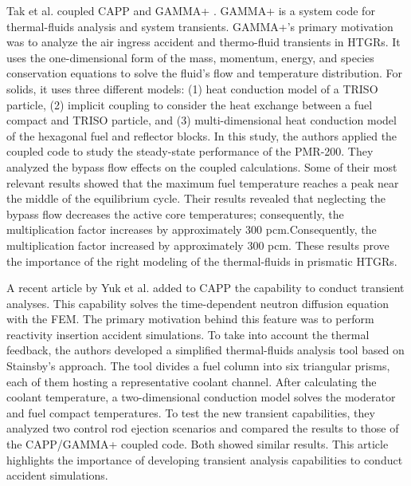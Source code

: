Tak et al. \cite{tak_cappgamma_2016} coupled CAPP and GAMMA+ \cite{lim_gamma_2006}.
GAMMA+ is a system code for thermal-fluids analysis and system transients.
GAMMA+'s primary motivation was to analyze the air ingress accident and thermo-fluid transients in HTGRs.
It uses the one-dimensional form of the mass, momentum, energy, and species conservation equations to solve the fluid's flow and temperature distribution.
For solids, it uses three different models: (1) heat conduction model of a TRISO particle, (2) implicit coupling to consider the heat exchange between a fuel compact and TRISO particle, and (3) multi-dimensional heat conduction model of the hexagonal fuel and reflector blocks.
In this study, the authors applied the coupled code to study the steady-state performance of the PMR-200.
They analyzed the bypass flow effects on the coupled calculations.
Some of their most relevant results showed that the maximum fuel temperature reaches a peak near the middle of the equilibrium cycle.
Their results revealed that neglecting the bypass flow decreases the active core temperatures; consequently, the multiplication factor increases by approximately 300 pcm.Consequently, the multiplication factor increased by approximately 300 pcm.
These results prove the importance of the right modeling of the thermal-fluids in prismatic HTGRs.

A recent article by Yuk et al. \cite{yuk_time-dependent_2020} added to CAPP the capability to conduct transient analyses.
This capability solves the time-dependent neutron diffusion equation with the \gls{FEM}.
The primary motivation behind this feature was to perform reactivity insertion accident simulations.
To take into account the thermal feedback, the authors developed a simplified thermal-fluids analysis tool based on Stainsby's approach.
The tool divides a fuel column into six triangular prisms, each of them hosting a representative coolant channel.
After calculating the coolant temperature, a two-dimensional conduction model solves the moderator and fuel compact temperatures.
To test the new transient capabilities, they analyzed two control rod ejection scenarios and compared the results to those of the CAPP/GAMMA+ coupled code.
Both showed similar results.
This article highlights the importance of developing transient analysis capabilities to conduct accident simulations.

